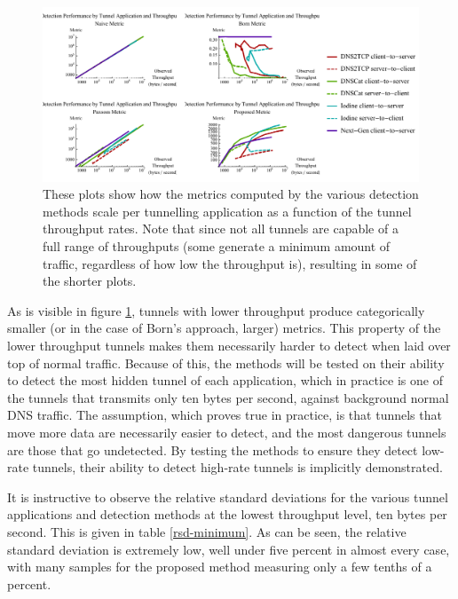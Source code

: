 \documentclass[12pt]{report}
\theoremstyle{remark}
\theoremstyle{definition}
\theoremstyle{definition}
\theoremstyle{definition}
\begin{document}
\begin{figure}
\centering
\includegraphics[width=\textwidth]{../figures/mpbtt.pdf}
\caption[Scaling of Detection Metrics by Tunnel Throughput]{These plots show how
the metrics computed by the various detection methods scale per tunnelling
application as a function of the tunnel throughput rates. Note that since not
all tunnels are capable of a full range of throughputs (some generate a minimum
amount of traffic, regardless of how low the throughput is), resulting in some
of the shorter plots.}
\label{mbtt}
\end{figure}

As is visible in figure \ref{mbtt}, tunnels with lower throughput produce
categorically smaller (or in the case of Born's approach, larger) metrics. This
property of the lower throughput tunnels makes them necessarily harder to detect
when laid over top of normal traffic. Because of this, the methods will be
tested on their ability to detect the most hidden tunnel of each application,
which in practice is one of the tunnels that transmits only ten bytes per
second, against background normal DNS traffic. The assumption, which proves true
in practice, is that tunnels that move more data are necessarily easier to
detect, and the most dangerous tunnels are those that go undetected. By testing
the methods to ensure they detect low-rate tunnels, their ability to detect
high-rate tunnels is implicitly demonstrated.

It is instructive to observe the relative standard deviations for the various
tunnel applications and detection methods at the lowest throughput level, ten
bytes per second. This is given in table \ref{rsd-minimum}. As can be seen, the
relative standard deviation is extremely low, well under five percent in almost
every case, with many samples for the proposed method measuring only a few
tenths of a percent.
\end{document}
